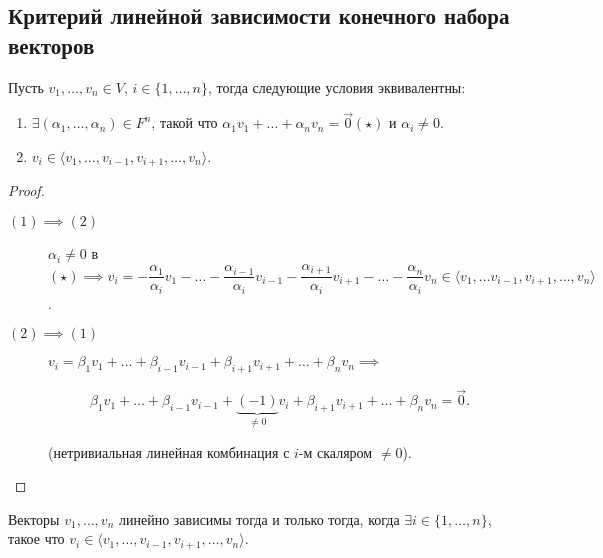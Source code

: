 \subsection{Критерий линейной зависимости конечного набора векторов}

\begin{proposal}
    \label{lec11:proposal_a_i}
    Пусть $v_1, \dots, v_n \in V$, $i \in \{1, \dots, n\}$, тогда следующие условия эквивалентны:
    \begin{enumerate}
        \item $\exists (\alpha_1, \dots, \alpha_n) \in F^n$, такой что $\alpha_1 v_1 + \dots + \alpha_n v_n = \overrightarrow{0} (\star) $ и $\alpha_i \neq 0$. 
        \item $v_i \in \langle v_1, \dots, v_{i - 1}, v_{i + 1}, \dots, v_n \rangle$.
    \end{enumerate}
\end{proposal}

\begin{proof}~
    \begin{description}
        \item[$(1) \implies (2)$] $\alpha_i \neq 0$ в $(\star) \implies v_i = -\dfrac{\alpha_1}{\alpha_i} v_1 - \dots - \dfrac{\alpha_{i - 1}}{\alpha_i} v_{i - 1} - \dfrac{\alpha_{i + 1}}{\alpha_i} v_{i + 1} - \dots - \dfrac{\alpha_n}{\alpha_i} v_n \in \langle v_1, \dots v_{i - 1}, v_{i + 1}, \dots, v_n \rangle$.
        \item[$(2) \implies (1)$] 
            $v_i = \beta_1 v_1 + \dots + \beta_{i - 1} v_{i - 1} + \beta_{i + 1} v_{i + 1} + \dots + \beta_n v_n \implies $
            
            \begin{equation*}
                \beta_1 v_1 + \dots + \beta_{i - 1} v_{i - 1} + \underbrace{(-1)}_{\neq 0} v_i + \beta_{i + 1} v_{i + 1} + \dots + \beta_n v_n = \overrightarrow{0}
            .\end{equation*}

            (нетривиальная линейная комбинация с $i$-м скаляром $\neq 0$). \qedhere
    \end{description}
\end{proof}

\begin{corollary}
    Векторы $v_1, \dots, v_n$ линейно зависимы тогда и только тогда, когда $\exists i \in \{1, \dots, n\}$, такое что $v_i \in \langle v_1, \dots, v_{i - 1}, v_{i + 1}, \dots, v_n \rangle$.
\end{corollary}


